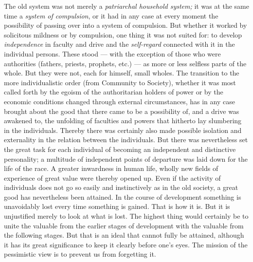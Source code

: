 \documentclass[12pt,a4paper,openany]{book}
\newcommand{\opage}[1]{\marginnote{\footnotesize\textit{[#1]}}}
\begin{document}
The old system was not merely a \emph{patriarchal
household system;} it was at the same time a \emph{system of compulsion}, or it had in
any case at every moment the possibility of passing over into
a system of compulsion. But whether it worked by
solicitous mildness or by compulsion, one thing it was not suited
for: to develop \emph{independence} in faculty and drive and the \emph{self-regard}
connected with it in the individual persons. These stood ---
with the exception of those who were authorities (fathers, priests,
prophets, etc.) --- as more or less selfless parts of the
whole. But they were not, each for himself, small wholes.
The transition to the more individualistic order (from Community
to Society), whether it was most called forth by the
egoism of the authoritarian holders of power or by the economic conditions
changed through external circumstances, has in any
case brought about the good that there came to be a possibility of, and
a drive was awakened to, the unfolding of faculties and powers that hitherto lay
slumbering in the individuals. Thereby
there was certainly also made possible isolation and externality in the relation between the
\opage{152}individuals. But there was nevertheless set the great task for each
individual of becoming an independent and distinctive
personality; a multitude of independent points of departure
was laid down for the life of the race. A greater inwardness in human
life, wholly new fields of experience of great value were thereby
opened up. Even if the activity of individuals does not go so
easily and instinctively as in the old society, a
great good has nevertheless been attained. In the course of development
something is unavoidably lost every time something is gained.
That is how it is. But it is unjustified merely to look
at what is lost. The highest thing would certainly be to
unite the valuable from the earlier stages of development with
the valuable from the following stages. But that is an ideal
that cannot fully be attained, although it has its great significance
to keep it clearly before one's eyes. The mission of the pessimistic view
is to prevent us from forgetting it.
\end{document}
